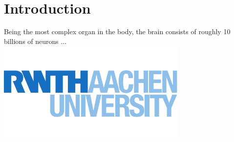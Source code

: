 \chapter{Introduction}
Being the most complex organ in the body, the brain consists of roughly 10 billions of neurons\cite{mueller2000} ...
\\

\includegraphics{figures/rwth}